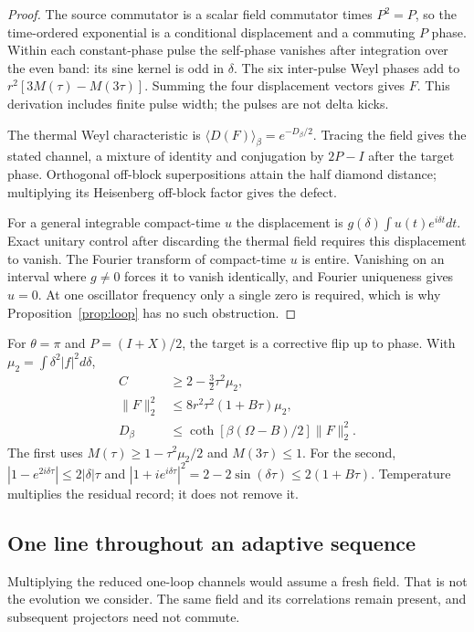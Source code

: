\begin{proof}
The source commutator is a scalar field commutator times $P^2=P$,
so the time-ordered exponential is a conditional displacement and a
commuting $P$ phase. Within each constant-phase pulse the self-phase
vanishes after integration over the even band: its sine kernel is odd
in $\delta$. The six inter-pulse Weyl phases add to
$r^2[3M(\tau)-M(3\tau)]$. Summing the four displacement vectors gives
$F$. This derivation includes finite pulse width; the pulses are not
delta kicks.

The thermal Weyl characteristic is
$\langle D(F)\rangle_\beta=e^{-D_\beta/2}$.
Tracing the field gives the stated channel, a mixture of identity and
conjugation by $2P-I$ after the target phase. Orthogonal off-block
superpositions attain the half diamond distance; multiplying its
Heisenberg off-block factor gives the defect.

For a general integrable compact-time $u$ the displacement is
$g(\delta)\int u(t)e^{i\delta t}dt$. Exact unitary control after discarding
the thermal field requires this displacement to vanish. The Fourier
transform of compact-time $u$ is entire. Vanishing on an interval where
$g\ne0$ forces it to vanish identically, and Fourier uniqueness gives
$u=0$. At one oscillator frequency only a single zero is required,
which is why Proposition~\ref{prop:loop} has no such obstruction.
\end{proof}

For $\theta=\pi$ and $P=(I+X)/2$, the target is a corrective flip up
to phase. With $\mu_2=\int\delta^2|f|^2d\delta$,
\begin{align}
 C&\ge2-\tfrac32\tau^2\mu_2, \label{eq:line-Cbound}\\
 \|F\|_2^2&\le8r^2\tau^2(1+B\tau)\mu_2, \label{eq:line-Fbound}\\
 D_\beta&\le
 \coth[\beta(\Omega-B)/2]\|F\|_2^2. \label{eq:line-Dbound}
\end{align}
The first uses $M(\tau)\ge1-\tau^2\mu_2/2$ and
$M(3\tau)\le1$. For the second, $|1-e^{2i\delta\tau}|\le2|\delta|\tau$
and $|1+ie^{i\delta\tau}|^2=2-2\sin(\delta\tau)\le2(1+B\tau)$.
Temperature multiplies the residual record; it does not remove it.

\subsection{One line throughout an adaptive sequence}

Multiplying the reduced one-loop channels would assume a fresh field.
That is not the evolution we consider. The same field and its correlations
remain present, and subsequent projectors need not commute.

